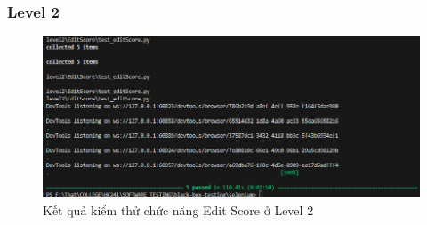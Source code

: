 \subsubsection{Level 2}
\begin{figure}[H]
    \centering
    \includegraphics[width=0.8\linewidth]{image/edit-score-lv2.png}
    \caption{Kết quả kiểm thử chức năng Edit Score ở Level 2}
    \label{fig:enter-label}
\end{figure}

